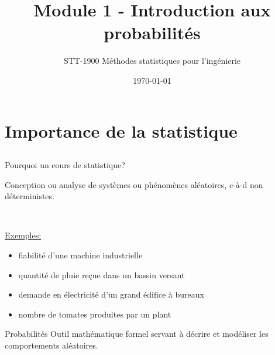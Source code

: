 \documentclass{BeamerTemplate}
\title{Module 1 - Introduction aux probabilités}
\subtitle{STT-1900 Méthodes statistiques pour l'ingénierie}
\date{\today}
\begin{document}
\begin{frame}[t]
  \titlepage
\end{frame}








\section[Statistique]{Importance de  la statistique}

\subsection*{ }

\begin{frame}[t]{Pourquoi un cours de statistique?}

Conception ou analyse de systèmes ou phénomènes  \alert{aléatoires}, c-à-d non déterministes.

\bigskip
{\ }

 \underline{Exemples:}

\begin{itemize}
\item fiabilité d'une machine industrielle
\item quantité de pluie reçue dans un bassin versant
\item demande en électricité d'un grand édifice à bureaux
\item nombre de tomates produites par un plant
\end{itemize}

\end{frame}

\begin{frame}[t]%
 \begin{Boite}{Probabilités}
 Outil mathématique formel  servant à décrire et modéliser les comportements aléatoires.
 \end{Boite}

 \medskip


\end{frame}
\end{document}
